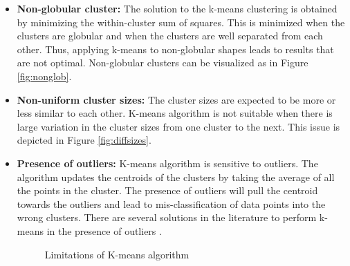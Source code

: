 \begin{itemize}
\item \textbf{Non-globular cluster:} The solution to the k-means clustering is obtained by minimizing the within-cluster sum of squares. This is minimized when the clusters are globular and when the clusters are well separated from each other. Thus, applying k-means to non-globular shapes leads to results that are not optimal. Non-globular clusters can be visualized as in Figure \ref{fig:nonglob}.

\item \textbf{Non-uniform cluster sizes:} The cluster sizes are expected to be more or less similar to each other. K-means algorithm is not suitable when there is large variation in the cluster sizes from one cluster to the next. This issue is depicted in Figure \ref{fig:diffsizes}.

\item \textbf{Presence of outliers:} K-means algorithm is sensitive to outliers. The algorithm updates the centroids of the clusters by taking the average of all the points in the cluster. The presence of outliers will pull the centroid towards the outliers and lead to mis-classification of data points into the wrong clusters. There are several solutions in the literature to perform k-means in the presence of outliers \cite{dave_robust_1997, gan_k_2017, jiang_giniclust_2016, hautamaki_improving_2005}.

\begin{figure}[!htp]
  \centering
  \hfill
  \caption{Limitations of K-means algorithm\\}
\end{figure}

\end{itemize}

